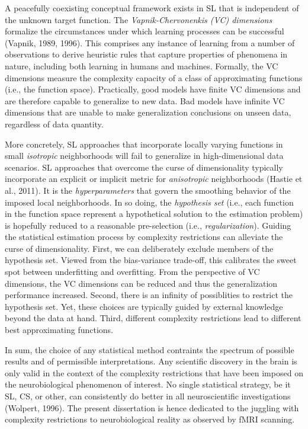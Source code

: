 \documentclass[authoryear,review,3p]{elsarticle}
\begin{document}
A peacefully coexisting conceptual framework exists in SL
that is independent
of the unknown target function.
The \textit{Vapnik-Chervonenkis (VC) dimensions}
formalize the circumstances
under which learning processes can be successful (Vapnik, 1989, 1996).
This comprises any instance of learning
from a number of observations
to derive heuristic rules that capture properties of phenomena in nature,
including both learning in humans and machines.
Formally, the VC dimensions measure the
complexity capacity of a class of approximating functions
(i.e., the function space). 
%
Practically, good models have finite VC dimensions
and are therefore capable to generalize to new data.
Bad models have infinite VC dimensions that
are unable to make generalization conclusions on unseen data,
regardless of data quantity.



More concretely,
SL approaches that incorporate locally varying functions
in small \textit{isotropic} neighborhoods
will fail to generalize in high-dimensional data scenarios.
SL approaches that overcome the curse of dimensionality typically
incorporate an explicit or implicit metric for
\textit{anisotropic} neighborhoods
(Hastie et al., 2011).
%
It is the \textit{hyperparameters} that govern the
smoothing behavior of the imposed local neighborhoods.
%
In so doing,
the \textit{hypothesis set} (i.e., each function in the function space
represent a hypothetical solution to
the estimation problem) is hopefully reduced to
a reasonable pre-selection (i.e., \textit{regularization}).
%
Guiding the statistical estimation process by
complexity restrictions can alleviate the curse of dimensionality.
First,
we can deliberately exclude members of the hypothesis set.
Viewed from the bias-variance trade-off, this calibrates
the sweet spot between underfitting and overfitting.
From the perspective of VC dimensions,
the VC dimensions can be reduced and thus the generalization performance
increased.
%
Second, there is an infinity of possiblities to restrict the hypothesis set.
Yet, these choices are typically guided by external knowledge beyond
the data at hand.
%
Third,
different complexity restrictions lead to different
best approximating functions.



In sum,
the choice of any statistical method contraints
the spectrum of possible results and of permissible interpretations.
Any scientific discovery in the brain is only valid in the
context of the complexity restrictions that have been imposed
on the neurobiological phenomenon of interest.
%
No single statistical strategy, be it SL, CS, or other,
can consistently
do better in all neuroscientific investigations
(Wolpert, 1996).
%
The present dissertation
is hence dedicated to the juggling with
complexity restrictions to
neurobiological reality as observed by fMRI scanning.
\end{document}
